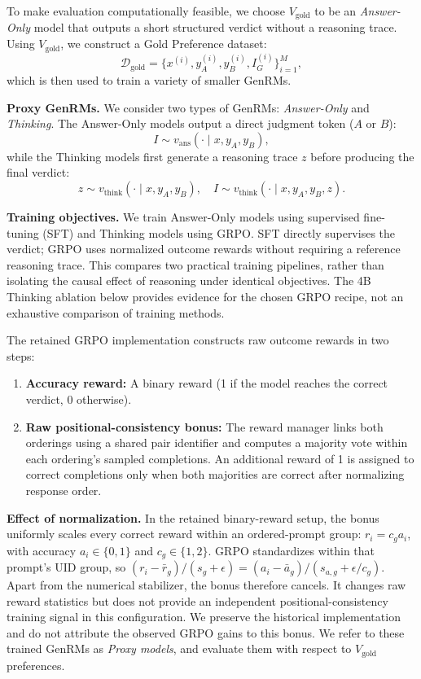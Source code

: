 \documentclass[11pt,letterpaper]{article}
\begin{document}
To make evaluation computationally feasible, we choose $V_{\text{gold}}$ to be an \emph{Answer-Only} model that outputs a short structured verdict without a reasoning trace. Using $V_{\text{gold}}$, we construct a Gold Preference dataset:
\[
\mathcal{D}_{\text{gold}} = \{x^{(i)}, y_A^{(i)}, y_B^{(i)}, I_G^{(i)}\}_{i=1}^M,
\]
which is then used to train a variety of smaller GenRMs.

\textbf{Proxy GenRMs.} We consider two types of GenRMs: \emph{Answer-Only} and \emph{Thinking}. The Answer-Only models output a direct judgment token ($A$ or $B$):
\[
I \sim v_{\text{ans}}(\cdot \mid x, y_A, y_B),
\]
while the Thinking models first generate a reasoning trace $z$ before producing the final verdict:
\[
z \sim v_{\text{think}}(\cdot \mid x, y_A, y_B),
\quad I \sim v_{\text{think}}(\cdot \mid x, y_A, y_B, z).
\]

\textbf{Training objectives.} We train Answer-Only models using supervised fine-tuning (SFT) and Thinking models using GRPO. SFT directly supervises the verdict; GRPO uses normalized outcome rewards without requiring a reference reasoning trace. This compares two practical training pipelines, rather than isolating the causal effect of reasoning under identical objectives. The 4B Thinking ablation below provides evidence for the chosen GRPO recipe, not an exhaustive comparison of training methods.

The retained GRPO implementation constructs raw outcome rewards in two steps:
\begin{enumerate}
    \item \textbf{Accuracy reward:} A binary reward (1 if the model reaches the correct verdict, 0 otherwise).
    \item \textbf{Raw positional-consistency bonus:} The reward manager links both orderings using a shared pair identifier and computes a majority vote within each ordering's sampled completions. An additional reward of 1 is assigned to correct completions only when both majorities are correct after normalizing response order.
\end{enumerate}
\textbf{Effect of normalization.} In the retained binary-reward setup, the bonus uniformly scales every correct reward within an ordered-prompt group: $r_i=c_g a_i$, with accuracy $a_i\in\{0,1\}$ and $c_g\in\{1,2\}$. GRPO standardizes within that prompt's UID group, so $(r_i-\bar r_g)/(s_g+\epsilon)=(a_i-\bar a_g)/(s_{a,g}+\epsilon/c_g)$. Apart from the numerical stabilizer, the bonus therefore cancels. It changes raw reward statistics but does not provide an independent positional-consistency training signal in this configuration. We preserve the historical implementation and do not attribute the observed GRPO gains to this bonus.
We refer to these trained GenRMs as \emph{Proxy models}, and evaluate them with respect to $V_{\text{gold}}$ preferences.
\end{document}
